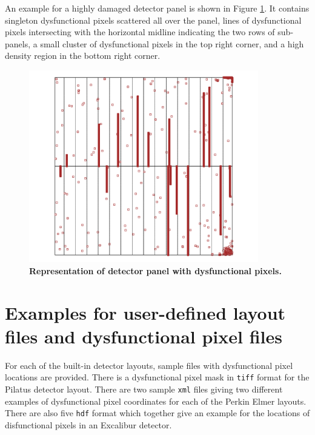 \documentclass[11pt,a4paper]{article}
\begin{document}
An example for a highly damaged detector panel is shown in Figure \ref{fig_damagedPixels}.
It contains singleton dysfunctional pixels scattered all over the panel, 
lines of dysfunctional pixels intersecting with the horizontal midline indicating the two rows of sub-panels, a small cluster of dysfunctional pixels in the top right corner, and a high density region in the bottom right corner. 

\begin{figure}[htbp]
\begin{center}
\includegraphics[width=10cm]{damagedPixels.png}
\caption
{
{\bfseries Representation of detector panel with dysfunctional pixels.}
}
\label{fig_damagedPixels}
\end{center}
\end{figure}


\section{Examples for user-defined layout files and dysfunctional pixel files}\label{examples}

For each of the built-in detector layouts, sample files with dysfunctional pixel locations are provided.
There is a dysfunctional pixel mask in \texttt{tiff} format for the Pilatus detector layout. There are two sample  \texttt{xml} files giving two different examples of dysfunctional pixel coordinates for each of the Perkin Elmer layouts. 
There are also five \texttt{hdf} format which together give an example for the locations of disfunctional pixels in an Excalibur detector.
\end{document}
